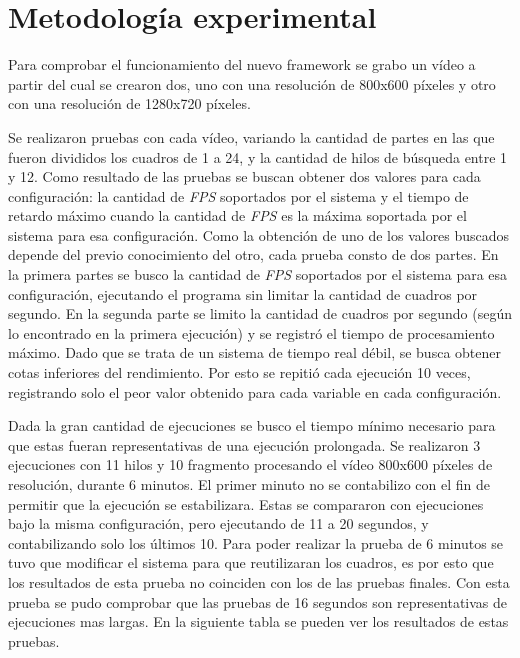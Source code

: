 
\section{Metodología experimental}

Para comprobar el funcionamiento del nuevo framework se grabo un vídeo a partir
del cual se crearon dos, uno con una resolución de 800x600 píxeles y otro con
una resolución de 1280x720 píxeles.

Se realizaron pruebas con cada vídeo, variando la cantidad de partes en las que
fueron divididos los cuadros de 1 a 24, y la cantidad de hilos de búsqueda entre
1 y 12. Como resultado de las pruebas se buscan obtener dos valores para cada
configuración: la cantidad de \emph{FPS} soportados por el sistema y el tiempo
de retardo máximo cuando la cantidad de \emph{FPS} es la máxima soportada por el
sistema para esa configuración. Como la obtención de uno de los valores buscados
depende del previo conocimiento del otro, cada prueba consto de dos partes.
En la primera partes se busco la cantidad de \emph{FPS} soportados por el
sistema para esa configuración, ejecutando el programa sin limitar la cantidad
de cuadros por segundo. En la segunda parte se limito la cantidad de
cuadros por segundo (según lo encontrado en la primera ejecución) y se registró
el tiempo de procesamiento máximo. Dado que se trata de un sistema de
tiempo real débil, se busca obtener cotas inferiores del rendimiento. Por esto
se repitió cada ejecución 10 veces, registrando solo el peor valor obtenido para
cada variable en cada configuración.

Dada la gran cantidad de ejecuciones se busco el tiempo mínimo necesario para
que estas fueran representativas de una ejecución prolongada. Se realizaron 3
ejecuciones con 11 hilos y 10 fragmento procesando el vídeo 800x600 píxeles de
resolución, durante 6 minutos. El primer minuto no se contabilizo con el fin de
permitir que la ejecución se estabilizara. Estas se compararon con ejecuciones
bajo la misma configuración, pero ejecutando de 11 a 20 segundos, y
contabilizando solo los últimos 10. Para poder realizar la prueba de 6 minutos
se tuvo que modificar el sistema para que reutilizaran los cuadros, es por esto
que los resultados de esta prueba no coinciden con los de las pruebas finales.
Con esta prueba se pudo comprobar que las pruebas de 16 segundos son
representativas de ejecuciones mas largas. En la siguiente tabla se pueden ver
los resultados de estas pruebas.

